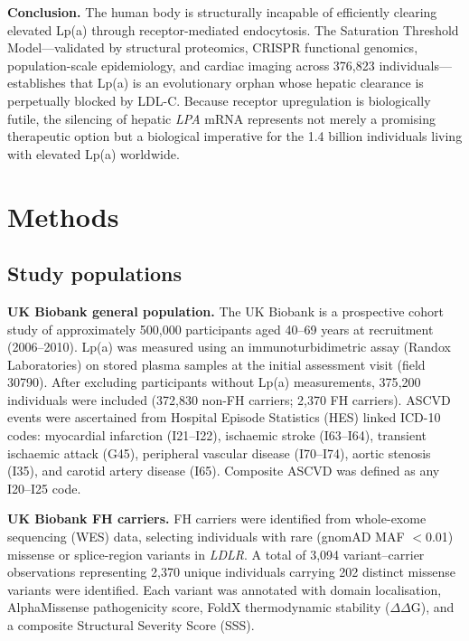 \documentclass[11pt,a4paper]{article}
\newcommand{\lpa}{Lp(a)}
\newcommand{\ukb}{UK Biobank}
\begin{document}
\textbf{Conclusion.} The human body is structurally incapable of efficiently clearing elevated \lpa{} through receptor-mediated endocytosis. The Saturation Threshold Model---validated by structural proteomics, CRISPR functional genomics, population-scale epidemiology, and cardiac imaging across 376{,}823 individuals---establishes that \lpa{} is an evolutionary orphan whose hepatic clearance is perpetually blocked by LDL-C. Because receptor upregulation is biologically futile, the silencing of hepatic \textit{LPA} mRNA represents not merely a promising therapeutic option but a biological imperative for the 1.4 billion individuals living with elevated \lpa{} worldwide.

\section*{Methods}

\subsection*{Study populations}

\textbf{UK Biobank general population.} The \ukb{} is a prospective cohort study of approximately 500{,}000 participants aged 40--69 years at recruitment (2006--2010)\cite{sudlow2015}. \lpa{} was measured using an immunoturbidimetric assay (Randox Laboratories) on stored plasma samples at the initial assessment visit (field 30790). After excluding participants without \lpa{} measurements, 375{,}200 individuals were included (372{,}830 non-FH carriers; 2{,}370 FH carriers). ASCVD events were ascertained from Hospital Episode Statistics (HES) linked ICD-10 codes: myocardial infarction (I21--I22), ischaemic stroke (I63--I64), transient ischaemic attack (G45), peripheral vascular disease (I70--I74), aortic stenosis (I35), and carotid artery disease (I65). Composite ASCVD was defined as any I20--I25 code.

\textbf{UK Biobank FH carriers.} FH carriers were identified from whole-exome sequencing (WES) data, selecting individuals with rare (gnomAD MAF $<$0.01) missense or splice-region variants in \textit{LDLR}. A total of 3{,}094 variant--carrier observations representing 2{,}370 unique individuals carrying 202 distinct missense variants were identified. Each variant was annotated with domain localisation, AlphaMissense pathogenicity score, FoldX thermodynamic stability ($\Delta\Delta$G), and a composite Structural Severity Score (SSS)\cite{genedy2026}.
\end{document}
